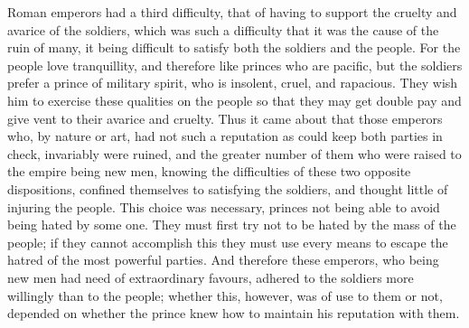 \documentclass[12pt,letterpaper]{memoir}
\begin{document}
Roman emperors had a third difficulty, that of having to support the
cruelty and avarice of the soldiers, which was such a difficulty that
it was the cause of the ruin of many, it being difficult to satisfy
both the soldiers and the people. For the people love tranquillity,
and therefore like princes who are pacific, but the soldiers prefer
a prince of military spirit, who is insolent, cruel, and rapacious.
They wish him to exercise these qualities on the people so that they
may get double pay and give vent to their avarice and cruelty. Thus it
came about that those emperors who, by nature or art, had not such a
reputation as could keep both parties in check, invariably were ruined,
and the greater number of them who were raised to the empire being
new men, knowing the difficulties of these two opposite dispositions,
confined themselves to satisfying the soldiers, and thought little of
injuring the people. This choice was necessary, princes not being able
to avoid being hated by some one. They must first try not to be hated
by the mass of the people; if they cannot accomplish this they must
use every means to escape the hatred of the most powerful parties. And
therefore these emperors, who being new men had need of extraordinary
favours, adhered to the soldiers more willingly than to the people;
whether this, however, was of use to them or not, depended on whether
the prince knew how to maintain his reputation with them.
\end{document}
